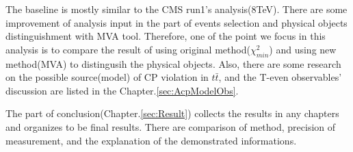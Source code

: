 		The baseline is mostly similar to the CMS run1's analysis(8TeV)\cite{Khachatryan:2016ngh}. There are some improvement of analysis input in the part of events selection and physical objects distinguishment with MVA tool. Therefore, one of the point we focus in this analysis is to compare the result of using original method($\chi^2_{min}$) and using new method(MVA) to distingusih the physical objects. Also, there are some research on the possible source(model) of CP violation in $t\bar{t}$, and the T-even observables' discussion are listed in the Chapter.\ref{sec:AcpModelObs}.

		The part of conclusion(Chapter.\ref{sec:Result}) collects the results in any chapters and organizes to be final results. There are comparison of method, precision of measurement, and the explanation of the demonstrated informations.


\FloatBarrier
